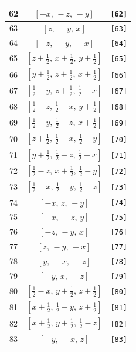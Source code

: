 \documentclass[fleqn,8pt]{jsarticle}
\begin{document}
\begin{longtable}{ccc}
62 & $\left[ - x,\, - z,\, - y \right]$ & {\tt [62]} \\ \hline
63 & $\left[ z,\, - y,\, x \right]$ & {\tt [63]} \\ \hline
64 & $\left[ - z,\, - y,\, - x \right]$ & {\tt [64]} \\ \hline
65 & $\left[ z + \frac{1}{2},\, x + \frac{1}{2},\, y + \frac{1}{2} \right]$ & {\tt [65]} \\ \hline
66 & $\left[ y + \frac{1}{2},\, z + \frac{1}{2},\, x + \frac{1}{2} \right]$ & {\tt [66]} \\ \hline
67 & $\left[ \frac{1}{2} - y,\, z + \frac{1}{2},\, \frac{1}{2} - x \right]$ & {\tt [67]} \\ \hline
68 & $\left[ \frac{1}{2} - z,\, \frac{1}{2} - x,\, y + \frac{1}{2} \right]$ & {\tt [68]} \\ \hline
69 & $\left[ \frac{1}{2} - y,\, \frac{1}{2} - z,\, x + \frac{1}{2} \right]$ & {\tt [69]} \\ \hline
70 & $\left[ z + \frac{1}{2},\, \frac{1}{2} - x,\, \frac{1}{2} - y \right]$ & {\tt [70]} \\ \hline
71 & $\left[ y + \frac{1}{2},\, \frac{1}{2} - z,\, \frac{1}{2} - x \right]$ & {\tt [71]} \\ \hline
72 & $\left[ \frac{1}{2} - z,\, x + \frac{1}{2},\, \frac{1}{2} - y \right]$ & {\tt [72]} \\ \hline
73 & $\left[ \frac{1}{2} - x,\, \frac{1}{2} - y,\, \frac{1}{2} - z \right]$ & {\tt [73]} \\ \hline
74 & $\left[ - x,\, z,\, - y \right]$ & {\tt [74]} \\ \hline
75 & $\left[ - x,\, - z,\, y \right]$ & {\tt [75]} \\ \hline
76 & $\left[ - z,\, - y,\, x \right]$ & {\tt [76]} \\ \hline
77 & $\left[ z,\, - y,\, - x \right]$ & {\tt [77]} \\ \hline
78 & $\left[ y,\, - x,\, - z \right]$ & {\tt [78]} \\ \hline
79 & $\left[ - y,\, x,\, - z \right]$ & {\tt [79]} \\ \hline
80 & $\left[ \frac{1}{2} - x,\, y + \frac{1}{2},\, z + \frac{1}{2} \right]$ & {\tt [80]} \\ \hline
81 & $\left[ x + \frac{1}{2},\, \frac{1}{2} - y,\, z + \frac{1}{2} \right]$ & {\tt [81]} \\ \hline
82 & $\left[ x + \frac{1}{2},\, y + \frac{1}{2},\, \frac{1}{2} - z \right]$ & {\tt [82]} \\ \hline
83 & $\left[ - y,\, - x,\, z \right]$ & {\tt [83]} \\ \hline

\end{longtable}
\end{document}
